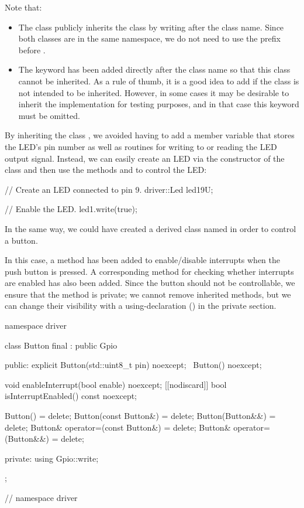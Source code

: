 \noindent Note that:
\begin{itemize}
  \item The class  publicly inherits the class  by writing
     after the class name. Since both classes are in the same namespace, we do
    not need to use the prefix  before .
  \item The keyword  has been added directly after the class name 
    so that this class cannot be inherited. As a rule of thumb, it is a good idea to add
     if the class is not intended to be inherited. However, in some cases it may be
    desirable to inherit the implementation for testing purposes, and in that case this keyword
    must be omitted.
\end{itemize}
By inheriting the class , we avoided having to add a member variable that
stores the LED's pin number as well as routines for writing to or reading the LED output signal.
Instead, we can easily create an LED via the constructor of the class  and then
use the methods  and  to control the LED:

\begin{cppcode}
// Create an LED connected to pin 9.
driver::Led led1{9U};

// Enable the LED.
led1.write(true);
\end{cppcode}

\noindent In the same way, we could have created a derived class named  in
order to control a button.

In this case, a method has been added to enable/disable interrupts when the push button is
pressed. A corresponding method for checking whether interrupts are enabled has also been added.
Since the button should not be controllable, we ensure that the method  is private;
we cannot remove inherited methods, but we can change their visibility with a using-declaration
() in the private section.

\begin{cppcode}
namespace driver
{
class Button final : public Gpio
{
public:
    explicit Button(std::uint8_t pin) noexcept;
    ~Button() noexcept;

    void enableInterrupt(bool enable) noexcept;
    [[nodiscard]] bool isInterruptEnabled() const noexcept;

    Button()                         = delete;
    Button(const Button&)            = delete;
    Button(Button&&)                 = delete;
    Button& operator=(const Button&) = delete;
    Button& operator=(Button&&)      = delete;

private:
    using Gpio::write;
};
} // namespace driver
\end{cppcode}

